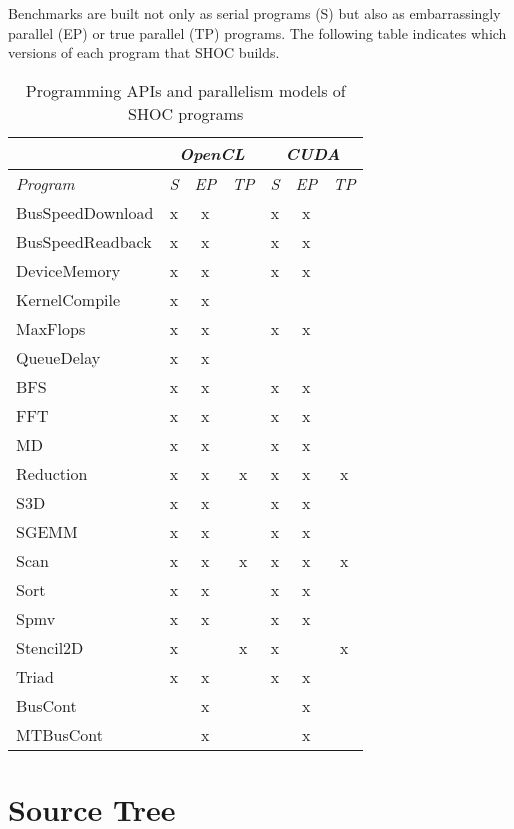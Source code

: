\documentclass[11pt]{article}
\begin{document}
Benchmarks are built not only as serial programs (S) but also as 
embarrassingly parallel (EP) or true parallel (TP) programs. 
The following table indicates which versions of each program that 
SHOC builds.

\begin{table}
\centering
\begin{tabular}{|l|c|c|c|c|c|c|}
\hline
 & \multicolumn{3}{c|}{\em OpenCL} & \multicolumn{3}{c|}{\em CUDA} \\
\hline
{\em Program} & {\em S} & {\em EP} & {\em TP} & {\em S} & {\em EP} & {\em TP} \\
\hline\hline
BusSpeedDownload    & x & x &   & x & x &   \\
BusSpeedReadback    & x & x &   & x & x &   \\
DeviceMemory        & x & x &   & x & x &   \\
KernelCompile       & x & x &   &   &   &   \\
MaxFlops            & x & x &   & x & x &   \\
QueueDelay          & x & x &   &   &   &   \\
BFS                 & x & x &   & x & x &   \\
FFT                 & x & x &   & x & x &   \\
MD                  & x & x &   & x & x &   \\
Reduction           & x & x & x & x & x & x \\
S3D                 & x & x &   & x & x &   \\
SGEMM               & x & x &   & x & x &   \\
Scan                & x & x & x & x & x & x \\
Sort                & x & x &   & x & x &   \\
Spmv                & x & x &   & x & x &   \\
Stencil2D           & x &   & x & x &   & x \\
Triad               & x & x &   & x & x &   \\
BusCont             &   & x &   &   & x &   \\
MTBusCont           &   & x &   &   & x &   \\
\hline
\end{tabular}
\caption{Programming APIs and parallelism models of SHOC programs}
\end{table}

\section{Source Tree}\label{sec:source}
\end{document}
